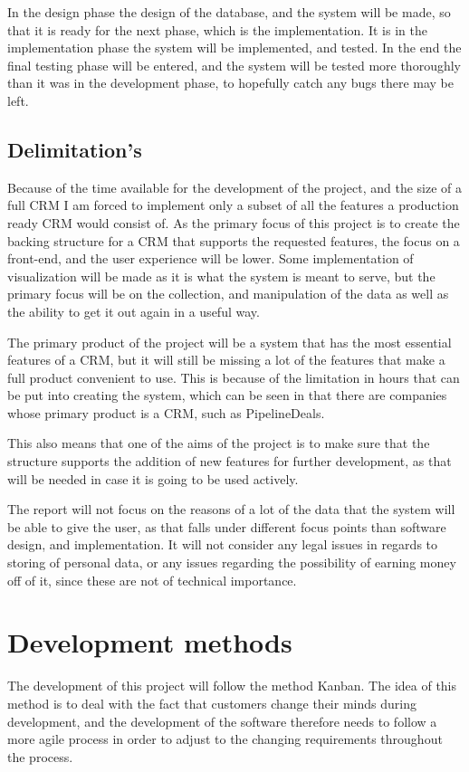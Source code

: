 In the design phase the design of the database, and the system will be made, so
that it is ready for the next phase, which is the implementation. It is in the
implementation phase the system will be implemented, and tested. In the end the
final testing phase will be entered, and the system will be tested more
thoroughly than it was in the development phase, to hopefully catch any bugs
there may be left. 

\subsection{Delimitation's}
\label{sub:Delimitations}
Because of the time available for the development of the project, and the size
of a full CRM I am forced to implement only a subset of all the features a
production ready CRM would consist of. As the primary focus of this project is
to create the backing structure for a CRM that supports the requested features,
the focus on a front-end, and the user experience will be lower. Some
implementation of visualization will be made as it is what the system is meant
to serve, but the primary focus will be on the collection, and manipulation of
the data as well as the ability to get it out again in a useful way. 

The primary product of the project will be a system that has the most essential
features of a CRM, but it will still be missing a lot of the features that make
a full product convenient to use. This is because of the limitation in hours
that can be put into creating the system, which can be seen in that there are
companies whose primary product is a CRM, such as PipelineDeals. 

This also means that one of the aims of the project is to make sure that the
structure supports the addition of new features for further development, as that
will be needed in case it is going to be used actively. 

The report will not focus on the reasons of a lot of the data that the system
will be able to give the user, as that falls under different focus points than
software design, and implementation. It will not consider any legal issues in
regards to storing of personal data, or any issues regarding the possibility of
earning money off of it, since these are not of technical importance. 

\section{Development methods}
\label{sec:Development methods}
The development of this project will follow the method Kanban. The idea of this
method is to deal with the fact that customers change their minds during
development, and the development of the software therefore needs to follow a
more agile process in order to adjust to the changing requirements throughout
the process. 

